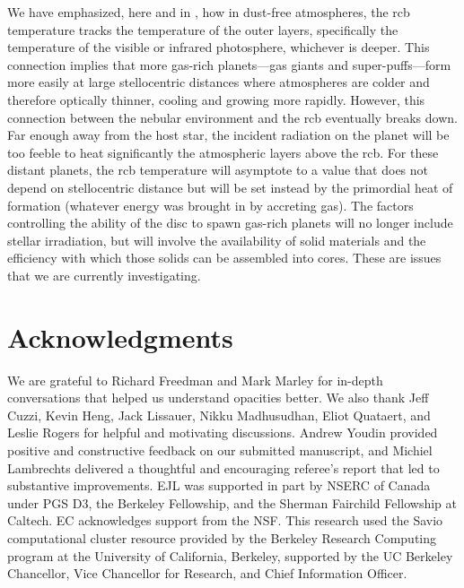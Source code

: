 \documentclass[fleqn,useAMS,usenatbib]{mnras}
\begin{document}
We have emphasized, here and in \citet{paper3}, how in dust-free atmospheres,
the rcb temperature tracks the temperature of the outer layers, specifically the temperature of the visible or infrared photosphere, whichever
is deeper. This connection implies that
more gas-rich planets---gas giants and super-puffs---form more easily
at large stellocentric distances where atmospheres are colder and therefore
optically thinner, cooling and growing more rapidly.
However, this connection between the nebular environment and the rcb eventually
breaks down. Far enough away from the host star, the incident radiation on the planet
will be too feeble to heat significantly the atmospheric layers above the rcb.
For these distant planets, the rcb temperature will asymptote to a value that
does not depend on stellocentric distance but will be set instead by the primordial
heat of formation (whatever energy was brought in by accreting gas). 
The factors controlling the ability of the disc to spawn gas-rich planets
will no longer include stellar irradiation, but will involve
the availability of solid materials and the efficiency with which
those solids can be assembled into cores. These are issues
that we are currently investigating.

\section*{Acknowledgments}

We are grateful to Richard Freedman and Mark Marley for in-depth conversations that helped us understand opacities better. We also thank Jeff Cuzzi, Kevin Heng, Jack Lissauer, Nikku Madhusudhan, Eliot Quataert, and Leslie Rogers 
for helpful and motivating discussions. 
Andrew Youdin provided positive and constructive feedback on our submitted
manuscript, and Michiel Lambrechts delivered a thoughtful and encouraging
referee's report that led to substantive improvements. 
EJL was supported in part by NSERC of Canada under PGS D3, the Berkeley Fellowship, and the Sherman Fairchild Fellowship at Caltech. EC acknowledges support from the NSF.
This research used the Savio computational cluster resource provided by the Berkeley Research Computing program at the University of California, Berkeley, supported by the UC Berkeley Chancellor, Vice Chancellor for Research, and Chief Information Officer.




\label{lastpage}
\end{document}
